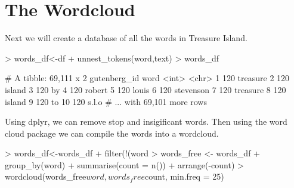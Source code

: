 \documentclass{article}
\begin{document}
\section{The Wordcloud}
Next we will create a database of all the words in Treasure Island.
\begin{Schunk}
\begin{Sinput}
> words_df<-df%>%
+   unnest_tokens(word,text)
> words_df
\end{Sinput}
\begin{Soutput}
# A tibble: 69,111 x 2
   gutenberg_id      word
          <int>     <chr>
 1          120  treasure
 2          120    island
 3          120        by
 4          120    robert
 5          120     louis
 6          120 stevenson
 7          120  treasure
 8          120    island
 9          120        to
10          120     s.l.o
# ... with 69,101 more rows
\end{Soutput}
\end{Schunk}

Using dplyr, we can remove stop and insigificant words. Then using the word cloud package we can compile the words into a wordcloud. 
\begin{Schunk}
\begin{Sinput}
> words_df<-words_df%>%
+   filter(!(word %in% stop_words$word))
> words_free <- words_df%>%
+   group_by(word)%>%
+   summarise(count = n())%>%
+   arrange(-count)
> wordcloud(words_free$word, words_free$count, min.freq = 25)
\end{Sinput}
\end{Schunk}
\end{document}
